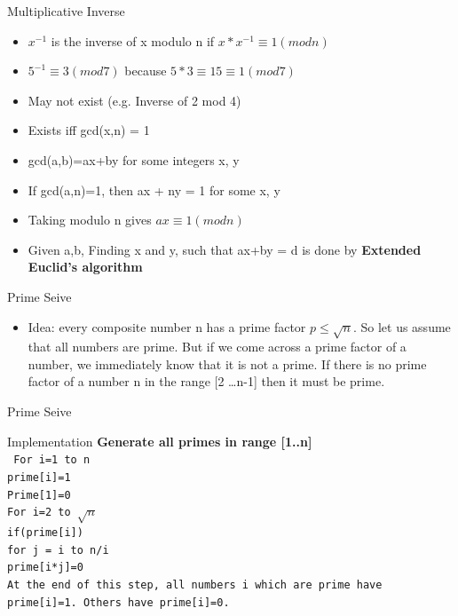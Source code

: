 \documentclass{beamer}
\begin{document}
\begin{frame}[<+->]{Multiplicative Inverse}
  \begin{block}{}
    \begin{itemize}
      \item $x^{-1}$ is the inverse of x modulo n if $x*x^{-1} \equiv 1(modn)$
      \item $5^{-1} \equiv 3(mod7)$ because $5*3 \equiv 15 \equiv 1(mod7)$
      \item May not exist (e.g. Inverse of 2 mod 4)
      \item \alert{Exists iff gcd(x,n) = 1}
      \item gcd(a,b)=ax+by for some integers x, y
      \item If gcd(a,n)=1, then ax + ny = 1 for some x, y
      \item Taking modulo n gives $ax \equiv 1(modn)$
      \item Given a,b, Finding x and y, such that ax+by = d is done by {\bf Extended Euclid's algorithm}
    \end{itemize}
  \end{block}
\end{frame}

\begin{frame}[<+->]{Prime Seive}
  \begin{block}{}
    \begin{itemize}
      \item Idea: every composite number n has a prime factor $p \leq \sqrt{n}$. So let us assume that all numbers are prime. But if we come across a prime factor of a number, we immediately know that it is not a prime. If there is no prime factor of a number n in the range [2 \dots n-1] then it must be prime.
    \end{itemize}
  \end{block}
\end{frame}

\begin{frame}[<+->]{Prime Seive}
  \begin{block}{Implementation}
      {\bf Generate all primes in range [1..n]}\\
      \tt{
	  For i=1 to n\\
	    \hspace{2mm} prime[i]=1\\
	  Prime[1]=0\\
	  For i=2 to $\sqrt{n}$\\
	    \hspace{2mm} if(prime[i])\\
	      \hspace{5mm} for j = i to n/i\\
		\hspace{8mm} prime[i*j]=0
	}\\
      At the end of this step, all numbers i which are prime have prime[i]=1. Others have prime[i]=0.
\end{block}
\end{frame}
\end{document}
